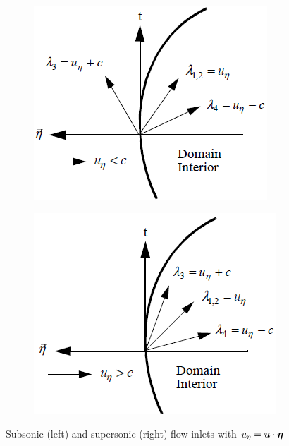 %
\begin{figure}[H]
        \centering
        \begin{subfigure}[b]{0.495\textwidth}
                \centering
                \includegraphics[width=\textwidth]{figures/sub_inlet_bc.png}
                \caption{\label{fig:sub_flow_inlet}}
        \end{subfigure}%
        \begin{subfigure}[b]{0.495\textwidth}
                \centering
                \includegraphics[width=\textwidth]{figures/sup_inlet_bc.png}
                \caption{\label{fig:sup_flow_inlet}}
        \end{subfigure}
        \caption{Subsonic (left) and supersonic (right) flow inlets\label{fig:inlet_sct3} with $u_\eta = \boldsymbol u \cdot \boldsymbol\eta$ \cite{RichThesis}}
\end{figure}

